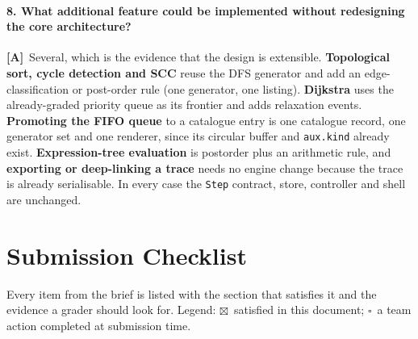 \documentclass[11pt,a4paper]{article}
\newcommand{\A}{\textcolor{asmc}{\textbf{[A]}}}     %
\newcommand{\ct}[1]{\texttt{#1}}
\newcommand{\done}{\textcolor{okc}{$\boxtimes$}}
\newcommand{\todo}{\textcolor{rulec}{$\square$}}
\begin{document}
\paragraph{8. What additional feature could be implemented without redesigning the core
architecture?}
\A\ Several, which is the evidence that the design is extensible. \textbf{Topological sort,
cycle detection and SCC} reuse the DFS generator and add an edge-classification or post-order
rule (one generator, one listing). \textbf{Dijkstra} uses the already-graded priority queue as
its frontier and adds relaxation events. \textbf{Promoting the FIFO queue} to a catalogue entry
is one catalogue record, one generator set and one renderer, since its circular buffer and
\ct{aux.kind} already exist. \textbf{Expression-tree evaluation} is postorder plus an arithmetic
rule, and \textbf{exporting or deep-linking a trace} needs no engine change because the trace is
already serialisable. In every case the \ct{Step} contract, store, controller and shell are
unchanged.

\section{Submission Checklist}

Every item from the brief is listed with the section that satisfies it and the evidence a
grader should look for. Legend: \done\ satisfied in this document; \todo\ a team action
completed at submission time.
\end{document}
